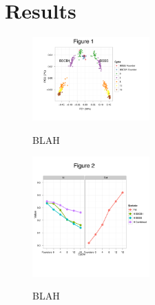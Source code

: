 \section*{Results}

\begin{figure}[tb]   
  \begin{center}
   \vspace{-0mm}
   \includegraphics[width=0.4\textwidth]{fig1}
   \renewcommand{\baselinestretch}{0.9}
   \vspace{-3mm}
   \caption{BLAH} 
\vspace{-6mm}
    \label{fig:pca}
  \end{center}
\end{figure}

\begin{figure}[tb]   
  \begin{center}
   \vspace{-0mm}
   \includegraphics[width=0.4\textwidth]{fig2}
   \renewcommand{\baselinestretch}{0.9}
   \vspace{-3mm}
   \caption{BLAH} 
\vspace{-6mm}
    \label{fig:decline}
  \end{center}
\end{figure}


